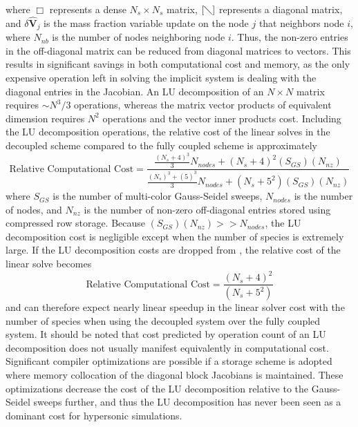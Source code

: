 where $\Box$ represents a dense $N_s \times N_s$ matrix, $[\diagdown]$ represents
a diagonal matrix, and $\delta \mathbf{\hat{V}}_j$  is the mass fraction
variable update on the node $j$ that neighbors node $i$, where $N_{nb}$ is the
number of nodes neighboring node $i$.  Thus, the non-zero entries in the
off-diagonal matrix can be reduced from diagonal matrices to vectors.  This
results in significant savings in both computational cost and memory, as the
only expensive operation left in solving the implicit system is dealing with the
diagonal entries in the Jacobian.  An LU decomposition of an $N \times N$ matrix
requires $\sim N^3/3$ operations, whereas the matrix vector products of
equivalent dimension requires $N^2$ operations and the vector inner products
cost.  Including the LU decomposition operations, the relative cost of the
linear solves in the decoupled scheme compared to the fully coupled scheme is
approximately
\begin{equation}
  \text{Relative Computational Cost} = 
  \frac{
    \frac{\left( N_s + 4 \right)^3}{3} N_{nodes} + \left( N_s + 4 \right)^2(S_{GS})(N_{nz})
  }{
    \frac{(N_s)^3 + (5)^3}{3} N_{nodes} + \left( N_s + 5^2\right)(S_{GS})(N_{nz})
  }
  \label{relative-lu-gs-cost}
\end{equation}
where $S_{GS}$ is the number of multi-color Gauss-Seidel sweeps, $N_{nodes}$ is
the number of nodes, and $N_{nz}$ is the number of non-zero off-diagonal entries
stored using compressed row storage\cite{George}.  Because $(S_{GS})(N_{nz}) >>
N_{nodes}$, the LU decomposition cost is negligible except when the number of
species is extremely large.  If the LU decomposition costs are dropped from
, the relative cost of the linear solve becomes
\begin{equation}
  \text{Relative Computational Cost} = 
  \frac{
   \left( N_s + 4 \right)^2
  }{
    \left( N_s + 5^2\right)
  }
  \label{relative-no-lu-gs-cost}
\end{equation}
and can therefore expect nearly linear speedup in the linear solver cost with the
number of species when using the decoupled system over the fully coupled system.
It should be noted that cost predicted by operation count of an LU decomposition
does not usually manifest equivalently in computational cost.  Significant
compiler optimizations are possible if a storage scheme is adopted where memory
collocation of the diagonal block Jacobians is maintained.  These optimizations
decrease the cost of the LU decomposition relative to the Gauss-Seidel sweeps
further, and thus the LU decomposition has never been seen as a dominant cost
for hypersonic simulations.


